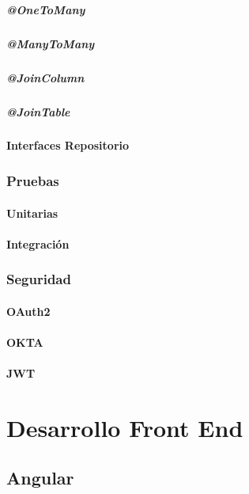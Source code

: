 \documentclass[12pt,article,oneside]{memoir}
\begin{document}
				\subsubsection{ @OneToMany }
				\subsubsection{ @ManyToMany }
				\subsubsection{ @JoinColumn }
				\subsubsection{ @JoinTable }
	\newpage
			\subsection{Interfaces Repositorio}
	\newpage
		\section{Pruebas}
			\subsection{Unitarias}
			\subsection{Integraci\'on}
	\newpage
		\section{Seguridad}
			\subsection{OAuth2}
			\subsection{OKTA}
			\subsection{JWT}
	\newpage
			
\part{  Desarrollo Front End}
	\chapter{Angular}
	\newpage
\end{document}
